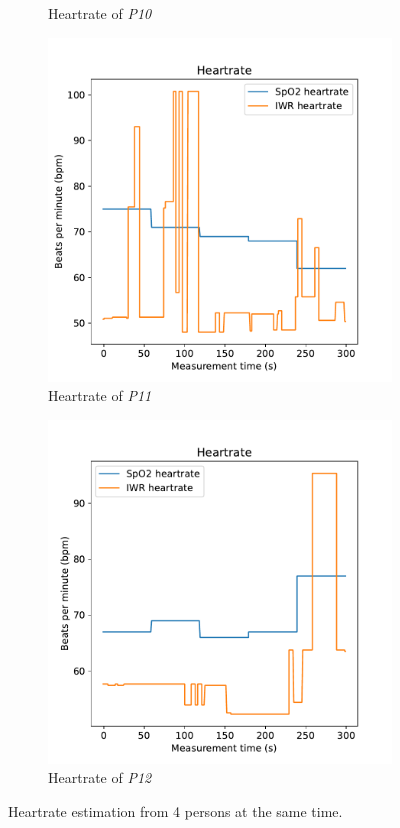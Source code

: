 \begin{figure}[t]
\begin{subfigure}{.45\textwidth}
  \caption{Heartrate of \emph{P10}}
  \label{fig:nick4_heart}
\end{subfigure}
\begin{subfigure}{.45\textwidth}
  \centering
  \includegraphics[width=\linewidth]{figures/validation/pascal4_heart.pdf}  
  \caption{Heartrate of \emph{P11}}
  \label{fig:pascal4_heart}
\end{subfigure}
\begin{subfigure}{.45\textwidth}
  \centering
  \includegraphics[width=\linewidth]{figures/validation/romy4_heart.pdf}  
  \caption{Heartrate of \emph{P12}}
  \label{fig:romy4_heart}
\end{subfigure}
\caption{Heartrate estimation from 4 persons at the same time.}
\label{fig:4pers_heart_meas}
\end{figure}

